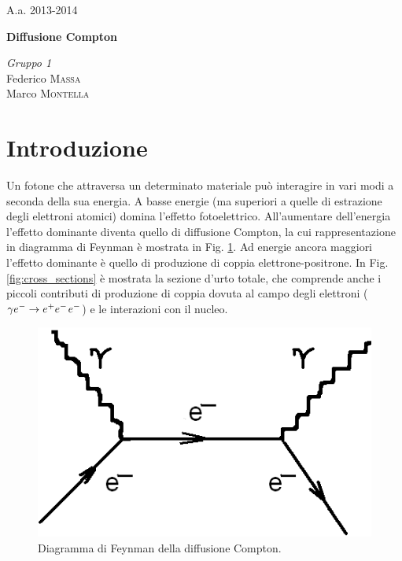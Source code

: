 \documentclass[5pt]{article}
\begin{document}
\justify
\printindex
\Large{A.a. 2013-2014}
\vspace{10cm}
\begin{center}
\Huge\textbf{Diffusione Compton}
\end{center}

\vspace{2cm}
\begin{flushleft}
\textit{Gruppo \textsc{1}} \\
\medskip
Federico \textsc{Massa} \\ 
Marco \textsc{Montella}
\end{flushleft}



\newpage

\begin{abstract}
\justify
 

\end{abstract}
\bigskip

\section{Introduzione} \label{sec:intro}
Un fotone che attraversa un determinato materiale può interagire in vari modi a seconda della sua energia. A basse energie (ma superiori a quelle di estrazione degli elettroni atomici) domina l'effetto fotoelettrico. All'aumentare dell'energia l'effetto dominante diventa quello di diffusione Compton, la cui rappresentazione in diagramma di Feynman è mostrata in Fig. \ref{fig:feynman}. Ad energie ancora maggiori l'effetto dominante è quello di produzione di coppia elettrone-positrone. In Fig. \ref{fig:cross_sections} è mostrata la sezione d'urto totale, che comprende anche i piccoli contributi di produzione di coppia dovuta al campo degli elettroni ($\gamma e^- \rightarrow e^+ e^- \hspace{1 pt} e^-$) e le interazioni con il nucleo. 

\begin{figure}
\begin{center}
\includegraphics[scale=0.5]{feynman}
\caption{Diagramma di Feynman della diffusione Compton.}
\label{fig:feynman}
\end{center}
\end{figure}
\end{document}
